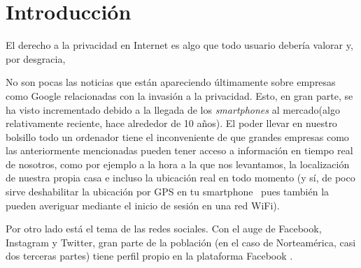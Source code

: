 \chapter{Introducción} 
\label{chap:intro}

\vspace{-0.2cm}

El derecho a la privacidad en Internet es algo que todo usuario
debería valorar y, por desgracia, 


No son pocas las noticias que están apareciendo últimamente sobre
empresas como Google relacionadas con la invasión a la
privacidad. Esto, en gran parte, se ha visto incrementado debido a la
llegada de los \textit{smartphones} al mercado(algo relativamente
reciente, hace alrededor de 10 años). El poder llevar en nuestro
bolsillo todo un ordenador tiene el inconveniente de que grandes
empresas como las anteriormente mencionadas pueden tener acceso a
información en tiempo real de nosotros, como por ejemplo a la hora a
la que nos levantamos, la localización de nuestra propia casa e
incluso la ubicación real en todo momento (y sí, de poco sirve
deshabilitar la ubicación por GPS en tu smartphone~\cite{article:GPSTracking} pues también la
pueden averiguar mediante el inicio de sesión en una red WiFi).

Por otro lado está el tema de las redes sociales. Con el auge de
Facebook, Instagram y Twitter, gran parte de la población (en el caso
de Norteamérica, casi dos terceras partes) tiene perfil propio en la
plataforma Facebook .


